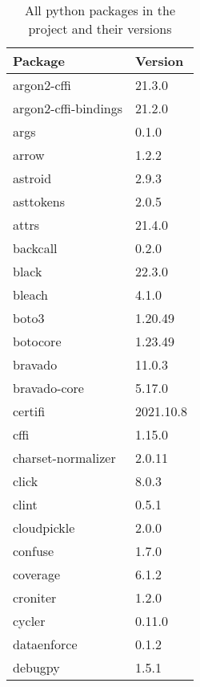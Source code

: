 
\begin{table}[h]
  \centering
  \caption{All python packages in the project and their versions}
  \label{table:python-packages-all}
  \begin{tabular}{|l|l|}\hline
    Package                      & Version   \\ \hline
    \hline
    argon2-cffi                  & 21.3.0    \\
    argon2-cffi-bindings         & 21.2.0    \\
    args                         & 0.1.0     \\
    arrow                        & 1.2.2     \\
    astroid                      & 2.9.3     \\
    asttokens                    & 2.0.5     \\
    attrs                        & 21.4.0    \\
    backcall                     & 0.2.0     \\
    black                        & 22.3.0    \\
    bleach                       & 4.1.0     \\
    boto3                        & 1.20.49   \\
    botocore                     & 1.23.49   \\
    bravado                      & 11.0.3    \\
    bravado-core                 & 5.17.0    \\
    certifi                      & 2021.10.8 \\
    cffi                         & 1.15.0    \\
    charset-normalizer           & 2.0.11    \\
    click                        & 8.0.3     \\
    clint                        & 0.5.1     \\
    cloudpickle                  & 2.0.0     \\
    confuse                      & 1.7.0     \\
    coverage                     & 6.1.2     \\
    croniter                     & 1.2.0     \\
    cycler                       & 0.11.0    \\
    dataenforce                  & 0.1.2     \\
    debugpy                      & 1.5.1     \\

\end{tabular}
\end{table}
